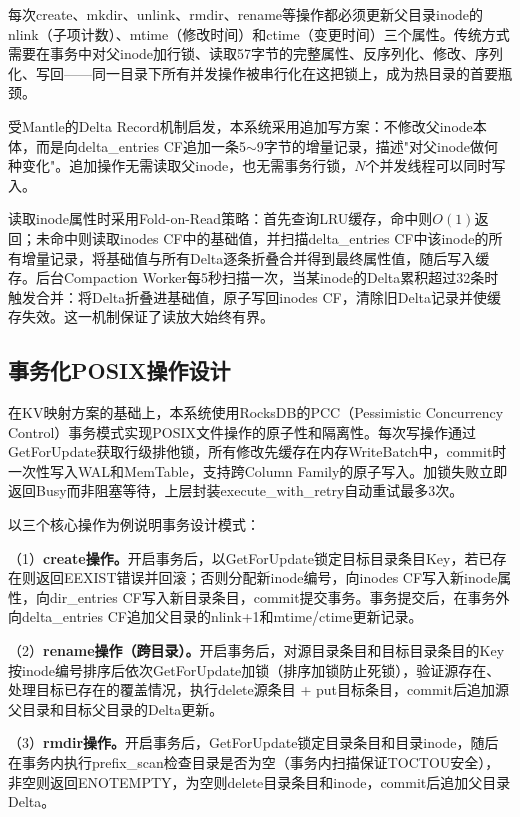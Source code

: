 \documentclass[supercite]{Hust-undergraduate-kaiti}
\theoremstyle{definition}
\begin{document}
每次create、mkdir、unlink、rmdir、rename等操作都必须更新父目录inode的nlink（子项计数）、mtime（修改时间）和ctime（变更时间）三个属性。传统方式需要在事务中对父inode加行锁、读取57字节的完整属性、反序列化、修改、序列化、写回——同一目录下所有并发操作被串行化在这把锁上，成为热目录的首要瓶颈。

受Mantle\cite{ref_mantle}的Delta Record机制启发，本系统采用追加写方案：不修改父inode本体，而是向delta\_entries CF追加一条5$\sim$9字节的增量记录，描述"对父inode做何种变化"。追加操作无需读取父inode，也无需事务行锁，$N$个并发线程可以同时写入。

读取inode属性时采用Fold-on-Read策略：首先查询LRU缓存，命中则$O(1)$返回；未命中则读取inodes CF中的基础值，并扫描delta\_entries CF中该inode的所有增量记录，将基础值与所有Delta逐条折叠合并得到最终属性值，随后写入缓存。后台Compaction Worker每5秒扫描一次，当某inode的Delta累积超过32条时触发合并：将Delta折叠进基础值，原子写回inodes CF，清除旧Delta记录并使缓存失效。这一机制保证了读放大始终有界。

\subsection{事务化POSIX操作设计}

在KV映射方案的基础上，本系统使用RocksDB的PCC（Pessimistic Concurrency Control）事务模式实现POSIX文件操作的原子性和隔离性。每次写操作通过GetForUpdate获取行级排他锁，所有修改先缓存在内存WriteBatch中，commit时一次性写入WAL和MemTable，支持跨Column Family的原子写入。加锁失败立即返回Busy而非阻塞等待，上层封装execute\_with\_retry自动重试最多3次。

以三个核心操作为例说明事务设计模式：

（1）\textbf{create操作。}开启事务后，以GetForUpdate锁定目标目录条目Key，若已存在则返回EEXIST错误并回滚；否则分配新inode编号，向inodes CF写入新inode属性，向dir\_entries CF写入新目录条目，commit提交事务。事务提交后，在事务外向delta\_entries CF追加父目录的nlink+1和mtime/ctime更新记录。

（2）\textbf{rename操作（跨目录）。}开启事务后，对源目录条目和目标目录条目的Key按inode编号排序后依次GetForUpdate加锁（排序加锁防止死锁），验证源存在、处理目标已存在的覆盖情况，执行delete源条目 + put目标条目，commit后追加源父目录和目标父目录的Delta更新。

（3）\textbf{rmdir操作。}开启事务后，GetForUpdate锁定目录条目和目录inode，随后在事务内执行prefix\_scan检查目录是否为空（事务内扫描保证TOCTOU安全），非空则返回ENOTEMPTY，为空则delete目录条目和inode，commit后追加父目录Delta。
\end{document}
